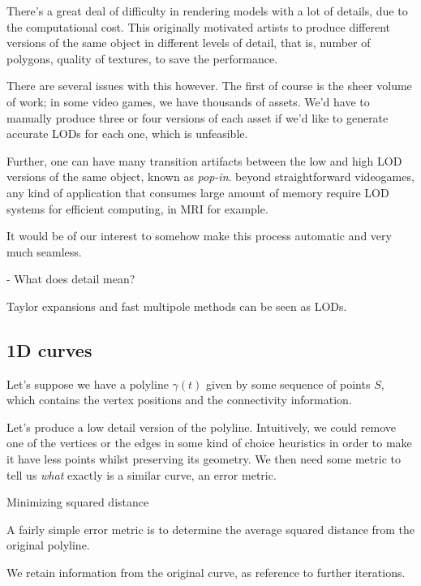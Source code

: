 There's a great deal of difficulty in rendering models
with a lot of details, due to the computational cost.
This originally motivated artists to produce 
different versions of the same object in different
levels of detail, that is, number of polygons,
quality of textures, to save the performance.

There are several issues with this however. The 
first of course is the sheer volume of work; in
some video games, we have thousands of assets. 
We'd have to manually produce three or four versions
of each asset if we'd like to generate accurate LODs
for each one, which is unfeasible.

Further, one can have many transition artifacts
between the low and high LOD versions of the same
object, known as \emph{pop-in}. beyond
straightforward videogames, any kind of
application that consumes large amount of memory
require LOD systems for efficient computing,
in MRI for example.

It would be of our interest to somehow make this
process automatic and very much seamless.

\begin{itemize}
    - What does detail mean?

\end{itemize}

Taylor expansions and fast multipole methods
can be seen as LODs.

\subsection{1D curves}

Let's suppose we have a polyline
$\gamma(t)$ given by some sequence of points
$S$, which contains the vertex positions 
and the connectivity information.

Let's produce a low detail version of the
polyline. Intuitively, we could remove one 
of the vertices or the edges in some kind 
of choice heuristics in order to make it
have less points whilst preserving its 
geometry. We then need some metric to 
tell us \emph{what} exactly is
a similar curve, an error metric.


Minimizing squared distance

A fairly simple error metric is to determine
the average squared distance from the original
polyline.



We retain information from the original
curve, as reference to further iterations.

